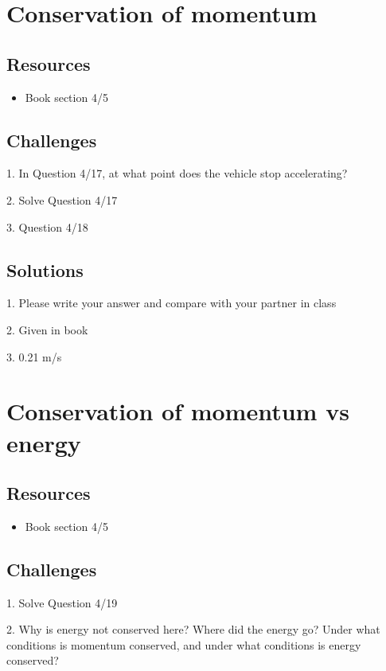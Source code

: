 \newpage
\section{Conservation of momentum}

\subsection*{Resources}
\begin{itemize}
    \item Book section 4/5
\end{itemize}

\subsection*{Challenges}
1. In Question 4/17, at what point does the vehicle stop accelerating? %

2. Solve Question 4/17

3. Question 4/18

\subsection*{Solutions}
1. Please write your answer and compare with your partner in class

2. Given in book

3. 0.21 m/s




\newpage
\section{Conservation of momentum vs energy}

\subsection*{Resources}
\begin{itemize}
    \item Book section 4/5
\end{itemize}

\subsection*{Challenges}
1. Solve Question 4/19

2. Why is energy not conserved here? Where did the energy go? Under what conditions is momentum conserved, and under what conditions is energy conserved?

